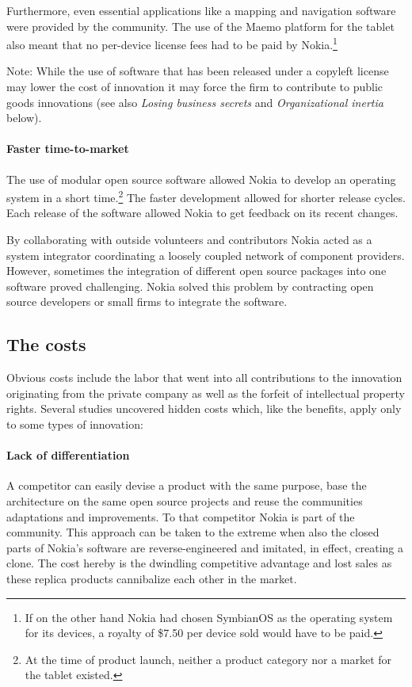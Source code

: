 \documentclass[a4paper]{scrartcl}
\begin{document}
Furthermore, even essential applications like a mapping and navigation software were provided by the community. 
The use of the Maemo platform for the tablet also meant that no per-device license fees had to be paid by Nokia.\footnote{If on the other hand Nokia had chosen SymbianOS as the operating system for its devices, a royalty of \$7.50 per device sold would have to be paid.}

Note: While the use of software that has been released under a copyleft license may lower the cost of innovation it may force the firm to contribute to public goods innovations (see also \emph{Losing business secrets} and \emph{Organizational inertia} below).

\paragraph{Faster time-to-market}
The use of modular open source software allowed Nokia to develop an operating system in a short time.\footnote{At the time of product launch, neither a product category nor a market for the tablet existed.}
The faster development allowed for shorter release cycles.
Each release of the software allowed Nokia to get feedback on its recent changes.

By collaborating with outside volunteers and contributors Nokia acted as a system integrator coordinating a loosely coupled network of component providers.
However, sometimes the integration of different open source packages into one software proved challenging. 
Nokia solved this problem by contracting open source developers or small firms to integrate the software. 

\subsection{The costs}

Obvious costs include the labor that went into all contributions to the innovation originating from the private company as well as the forfeit of intellectual property rights.
Several studies uncovered hidden costs which, like the benefits, apply only to some types of innovation:

\paragraph{Lack of differentiation}
A competitor can easily devise a product with the same purpose, base the architecture on the same open source projects and reuse the communities adaptations and improvements.
To that competitor Nokia is part of the community. 
This approach can be taken to the extreme when also the closed parts of Nokia's software are reverse-engineered and imitated, in effect, creating a clone.
The cost hereby is the dwindling competitive advantage and lost sales as these replica products cannibalize each other in the market.
\end{document}
